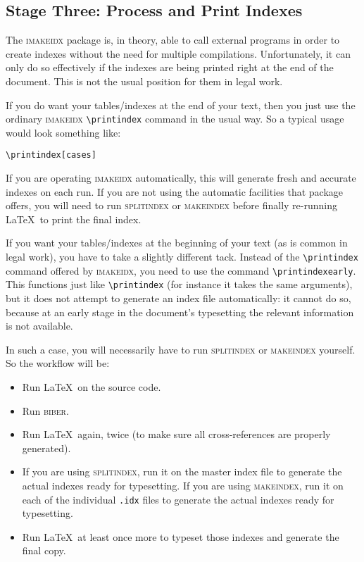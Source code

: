 \documentclass[a4paper,
               11pt,
	       DIV=1,			   
	       footinclude=false]
	      {scrartcl}
\newcounter{egcounter}\setcounter{egcounter}{0}
\newlength{\boxwidth}
\newenvironment{bibexample}[1][]
{%
  \medskip\par\noindent\ignorespaces
  \marginpar{[\refstepcounter{egcounter}\arabic{egcounter}]\label{#1}}%
  \setlength{\boxwidth}{0.95\linewidth}%
  \addtolength{\boxwidth}{-2\fboxsep}
  \addtolength{\boxwidth}{-2\fboxrule}
  \begin{lrbox}{\boxcontainer}
  \begin{minipage}[t]{\boxwidth}%
}
{%
  \end{minipage}\end{lrbox}%
  \colorbox{gray!30}{\usebox{\boxcontainer}}
  \par\medskip}
\begin{document}
\subsection{Stage Three: Process and Print Indexes}

The \textsc{imakeidx} package is, in theory, able to call external
programs in order to create indexes without the need for multiple
compilations. Unfortunately, it can only do so effectively if the
indexes are being printed right at the end of the document. This is
not the usual position for them in legal work.

If you do want your tables\slash indexes at the end of your text, then
you just use the ordinary \textsc{imakeidx} \verb|\printindex| command
 in the
usual way. So a typical usage would look something like:
\begin{bibexample}[printindex:1]
\begin{verbatim}
\printindex[cases]
\end{verbatim}
\end{bibexample}

If you are operating \textsc{imakeidx} automatically, this will
generate fresh and accurate indexes on each run. If you are not using
the automatic facilities that package offers, you will need to run
\textsc{splitindex} or \textsc{makeindex} before finally re-running
\LaTeX\ to print the final index.

If you want your tables\slash indexes at the beginning of your text
(as is common in legal work), you have to take a slightly different
tack. Instead of the \verb|\printindex| command offered by
\textsc{imakeidx}, you need to use the command
\verb|\printindexearly|. This functions just like \verb|\printindex|
(for instance it takes the same arguments), but it does not attempt to
generate an index file automatically: it cannot do so, because at an
early stage in the document's typesetting the relevant information is
not available.

In such a case, you will necessarily have to run \textsc{splitindex}
or \textsc{makeindex} yourself. So the workflow will be:
\begin{itemize}
\item Run \LaTeX\ on the source code.
\item Run \textsc{biber}.
\item Run \LaTeX\ again, twice (to make sure all cross-references are properly generated).
\item If you are using \textsc{splitindex}, run it on the master index
  file to generate the actual indexes ready for typesetting. If you
  are using \textsc{makeindex}, run it on each of the individual
  \texttt{.idx} files to generate the actual indexes ready for typesetting.
\item Run \LaTeX\ at least once more to typeset those indexes and
  generate the final copy.
\end{itemize}
\end{document}
